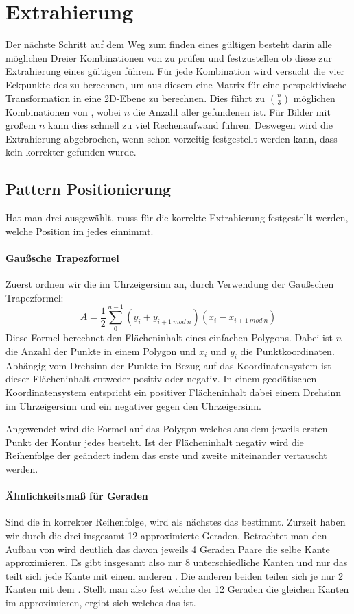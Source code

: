 \chapter{Extrahierung}

Der nächste Schritt auf dem Weg zum finden eines gültigen \QRCodes besteht darin alle möglichen Dreier Kombinationen von \fps zu prüfen und festzustellen ob diese zur Extrahierung eines gültigen \QRCodes führen. Für jede Kombination wird versucht die vier Eckpunkte des \QRCodes zu berechnen, um aus diesem eine Matrix für eine perspektivische Transformation in eine 2D-Ebene zu berechnen. Dies führt zu $\binom{n}{3}$ möglichen Kombinationen von \fps, wobei $n$ die Anzahl aller gefundenen \fps ist. Für Bilder mit großem $n$ kann dies schnell zu viel Rechenaufwand führen. Deswegen wird die Extrahierung abgebrochen, wenn schon vorzeitig festgestellt werden kann, dass kein korrekter \QRCode gefunden wurde.

\section{Pattern Positionierung}
Hat man drei \fps ausgewählt, muss für die korrekte Extrahierung festgestellt werden, welche Position im \QRCode jedes \fp einnimmt.
\subsubsection{Gaußsche Trapezformel} 
Zuerst ordnen wir die \fps im Uhrzeigersinn an, durch Verwendung der Gaußschen Trapezformel: 
$$ A=\frac{1}{2} \sum_{0}^{n-1} (y_i + y_{i+1\ mod\ n})(x_i - x_{i+1\ mod\ n}) $$
Diese Formel berechnet den Flächeninhalt eines einfachen Polygons. Dabei ist $n$ die Anzahl der Punkte in einem Polygon und $x_i$ und $y_i$ die Punktkoordinaten. Abhängig vom Drehsinn der Punkte im Bezug auf das Koordinatensystem ist dieser Flächeninhalt entweder positiv oder negativ. In einem geodätischen Koordinatensystem entspricht ein positiver Flächeninhalt dabei einem Drehsinn im Uhrzeigersinn und ein negativer gegen den Uhrzeigersinn.

Angewendet wird die Formel auf das Polygon welches aus dem jeweils ersten Punkt der Kontur jedes \fps besteht. Ist der Flächeninhalt negativ wird die Reihenfolge der \fps geändert indem das erste und zweite \fp miteinander vertauscht werden.
\subsubsection{Ähnlichkeitsmaß für Geraden}
Sind die \fps in korrekter Reihenfolge, wird als nächstes das \olfp bestimmt. Zurzeit haben wir durch die drei \fps insgesamt 12 approximierte Geraden. Betrachtet man den Aufbau von \QRCodes wird deutlich das davon jeweils 4 Geraden Paare die selbe Kante approximieren. Es gibt insgesamt also nur 8 unterschiedliche Kanten und nur das \olfp teilt sich jede Kante mit einem anderen \fp. Die anderen beiden \fps teilen sich je nur 2 Kanten mit dem \olfp. Stellt man also fest welche der 12 Geraden die gleichen Kanten im \QRCode approximieren, ergibt sich welches \fp das \olfp ist.

